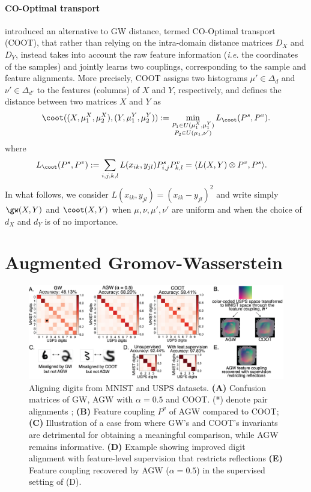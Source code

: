 \paragraph{CO-Optimal transport}
\citep{Redko20} introduced an alternative to GW distance, termed CO-Optimal transport (COOT),
that rather than relying on the intra-domain distance matrices $D_X$ and $D_Y$,
instead takes into account the raw feature information
(\textit{i.e.} the coordinates of the samples) and jointly learns two couplings,
corresponding to the sample and feature alignments. More precisely,
COOT assigns two histograms $\mu' \in \Delta_d$ and $\nu' \in \Delta_{d'}$ to the
features (columns) of $X$ and $Y$, respectively, and defines the distance between two matrices
$X$ and $Y$ as
\begin{equation*}
  \label{eq:co-optimal-transport}
 \begin{split}
     \coot((X, \mu_1^X, \mu_2^X), (Y, \mu_1^Y, \mu_2^Y)) :=
     \min_{\substack{P_1 \in U(\mu_1^X, \mu_1^Y) \\ P_2 \in U(\mu_1,\nu')}} L_{\coot} (P^s, P^v).
    \end{split}
 \end{equation*}
where
\begin{align*}
    L_\coot (P^s, P^v) &:=  \sum_{i,j,k,l} L(x_{ik},y_{jl})P^s_{i,j} P^v_{k,l}
    =\langle L(X,Y) \otimes P^v,  P^s \rangle.
\end{align*}
In what follows, we consider $L(x_{ik}, y_{jl}) = (x_{ik} - y_{jl})^2$ and write simply
$\gw(X, Y)$ and $\coot(X, Y)$ when $\mu, \nu, \mu', \nu'$
are uniform and when the choice of $d_X$ and $d_Y$ is of no importance.

\section{Augmented Gromov-Wasserstein}

\begin{figure}[t]
\centering
\includegraphics[width=\linewidth]{./Chapitre5/fig//mnist1_supervised.png}
\caption{Aligning digits from MNIST and USPS datasets. \textbf{(A)}
Confusion matrices of GW, AGW with $\alpha=0.5$ and COOT.
(*) denote pair alignments ;
\textbf{(B)} Feature coupling $P^v$ of AGW compared to COOT;
\textbf{(C)} Illustration of a case from where GW's and COOT's invariants are
detrimental for obtaining a meaningful comparison, while AGW remains informative.
\textbf{(D)} Example showing improved digit alignment with feature-level supervision
that restricts reflections \textbf{(E)} Feature coupling recovered by AGW ($\alpha =0.5$)
in the supervised setting of (D).}
\label{fig:mnist}
\end{figure}

